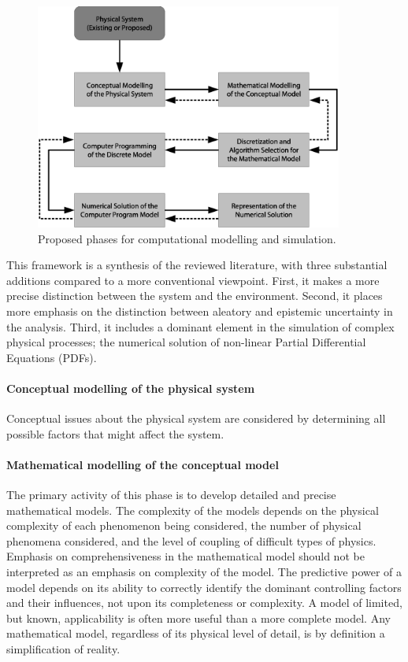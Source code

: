 \begin{figure}[htpb]
  \centering
    \includegraphics[width=0.90\textwidth]{./img/modelling_phases}
\caption[Proposed phases for computational modelling and simulation.]{Proposed
phases for computational modelling and simulation.
\citep[From][]{oberkampf2002-333}}
  \label{fig:modelling_phases}
\end{figure}

This framework is a synthesis of the reviewed literature, with three substantial
additions compared to a more conventional viewpoint. First, it makes a more
precise distinction between the system and the environment. Second, it places
more emphasis on the distinction between aleatory and epistemic uncertainty in
the analysis. Third, it includes a dominant element in the simulation of complex
physical processes; the numerical solution of non-linear Partial Differential
Equations (PDFs).

\paragraph{Conceptual modelling of the physical system}
Conceptual issues about the physical system are considered by determining all
possible factors that might affect the system.

\paragraph{Mathematical modelling of the conceptual model}
The primary activity of this phase is to develop detailed and precise
mathematical models. The complexity of the models depends on the physical
complexity of each phenomenon being considered, the number of physical phenomena
considered, and the level of coupling of difficult types of physics. Emphasis on
comprehensiveness in the mathematical model should not be interpreted as an
emphasis on complexity of the model. The predictive power of a model depends on
its ability to correctly identify the dominant controlling factors and their
influences, not upon its completeness or complexity. A model of limited, but
known, applicability is often more useful than a more complete model. Any
mathematical model, regardless of its physical level of detail, is by definition
a simplification of reality.

